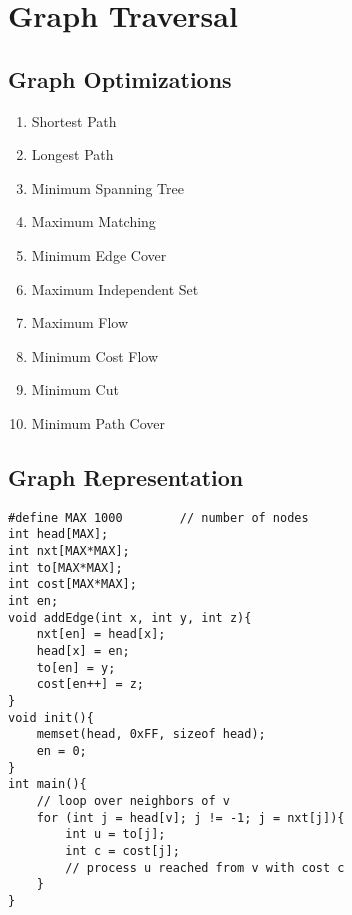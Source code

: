 \documentclass[12pt]{book}
\begin{document}
\chapter{Graph Traversal}
\section{Graph Optimizations}
\begin{enumerate}[label = \roman*.]
\item Shortest Path
\item Longest Path
\item Minimum Spanning Tree
\item Maximum Matching
\item Minimum Edge Cover
\item Maximum Independent Set
\item Maximum Flow
\item Minimum Cost Flow
\item Minimum Cut
\item Minimum Path Cover
\end{enumerate}
\section{Graph Representation}
\begin{verbatim}
#define MAX 1000		// number of nodes
int head[MAX];
int nxt[MAX*MAX];
int to[MAX*MAX];
int cost[MAX*MAX];
int en;
void addEdge(int x, int y, int z){
	nxt[en] = head[x];
	head[x] = en;
	to[en] = y;
	cost[en++] = z;
}
void init(){
	memset(head, 0xFF, sizeof head);
	en = 0;
}
int main(){
	// loop over neighbors of v
	for (int j = head[v]; j != -1; j = nxt[j]){
		int u = to[j];
		int c = cost[j];
		// process u reached from v with cost c
	}
}
\end{verbatim}
\end{document}

